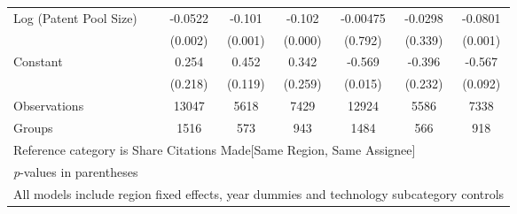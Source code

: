 \begin{sidewaystable}[htbp]
\begin{tabular}{l*{6}{c}}
Log (Patent Pool Size)&  -0.0522&   -0.101&   -0.102& -0.00475&  -0.0298&  -0.0801\\
                &  (0.002)&  (0.001)&  (0.000)&  (0.792)&  (0.339)&  (0.001)\\
Constant        &    0.254&    0.452&    0.342&   -0.569&   -0.396&   -0.567\\
                &  (0.218)&  (0.119)&  (0.259)&  (0.015)&  (0.232)&  (0.092)\\
\hline
Observations    &    13047&     5618&     7429&    12924&     5586&     7338\\
Groups          &     1516&      573&      943&     1484&      566&      918\\
\hline\hline
\multicolumn{7}{l}{\footnotesize Reference category is Share Citations Made[Same Region, Same Assignee]}\\
\multicolumn{7}{l}{\footnotesize \textit{p}-values in parentheses}\\
\multicolumn{7}{l}{\footnotesize All models include region fixed effects, year dummies and technology subcategory controls}\\
\end{tabular}
\end{sidewaystable}
